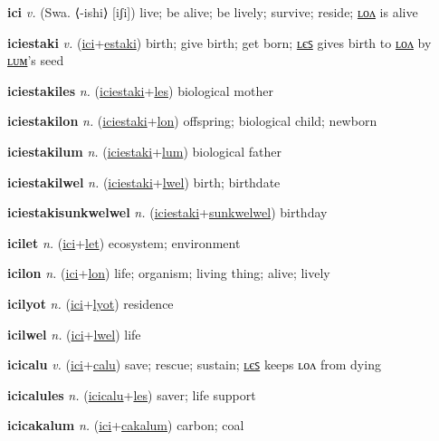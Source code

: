 \textbf{\hypertarget{ici}{ici}} \textit{v.} (Swa. ⟨-ishi⟩ [iʃi])
live; be alive; be lively; survive; reside; \hyperlink{icilon}{ʟᴏᴧ} is alive

\textbf{\hypertarget{iciestaki}{iciestaki}} \textit{v.} (\hyperlink{ici}{ici}+\allowbreak \hyperlink{estaki}{estaki})
birth; give birth; get born; \hyperlink{iciestakiles}{ʟєꜱ} gives birth to \hyperlink{iciestakilon}{ʟᴏᴧ} by \hyperlink{iciestakilum}{ʟᴜᴍ}’s seed

\textbf{\hypertarget{iciestakiles}{iciestakiles}} \textit{n.} (\hyperlink{iciestaki}{iciestaki}+\allowbreak \hyperlink{les}{les})
biological mother

\textbf{\hypertarget{iciestakilon}{iciestakilon}} \textit{n.} (\hyperlink{iciestaki}{iciestaki}+\allowbreak \hyperlink{lon}{lon})
offspring; biological child; newborn

\textbf{\hypertarget{iciestakilum}{iciestakilum}} \textit{n.} (\hyperlink{iciestaki}{iciestaki}+\allowbreak \hyperlink{lum}{lum})
biological father

\textbf{\hypertarget{iciestakilwel}{iciestakilwel}} \textit{n.} (\hyperlink{iciestaki}{iciestaki}+\allowbreak \hyperlink{lwel}{lwel})
birth; birthdate

\textbf{\hypertarget{iciestakisunkwelwel}{iciestakisunkwelwel}} \textit{n.} (\hyperlink{iciestaki}{iciestaki}+\allowbreak \hyperlink{sunkwelwel}{sunkwelwel})
birthday

\textbf{\hypertarget{icilet}{icilet}} \textit{n.} (\hyperlink{ici}{ici}+\allowbreak \hyperlink{let}{let})
ecosystem; environment

\textbf{\hypertarget{icilon}{icilon}} \textit{n.} (\hyperlink{ici}{ici}+\allowbreak \hyperlink{lon}{lon})
life; organism; living thing; alive; lively

\textbf{\hypertarget{icilyot}{icilyot}} \textit{n.} (\hyperlink{ici}{ici}+\allowbreak \hyperlink{lyot}{lyot})
residence

\textbf{\hypertarget{icilwel}{icilwel}} \textit{n.} (\hyperlink{ici}{ici}+\allowbreak \hyperlink{lwel}{lwel})
life

\textbf{\hypertarget{icicalu}{icicalu}} \textit{v.} (\hyperlink{ici}{ici}+\allowbreak \hyperlink{calu}{calu})
save; rescue; sustain; \hyperlink{icicalules}{ʟєꜱ} keeps ʟᴏᴧ from dying

\textbf{\hypertarget{icicalules}{icicalules}} \textit{n.} (\hyperlink{icicalu}{icicalu}+\allowbreak \hyperlink{les}{les})
saver; life support

\textbf{\hypertarget{icicakalum}{icicakalum}} \textit{n.} (\hyperlink{ici}{ici}+\allowbreak \hyperlink{cakalum}{cakalum})
carbon; coal

